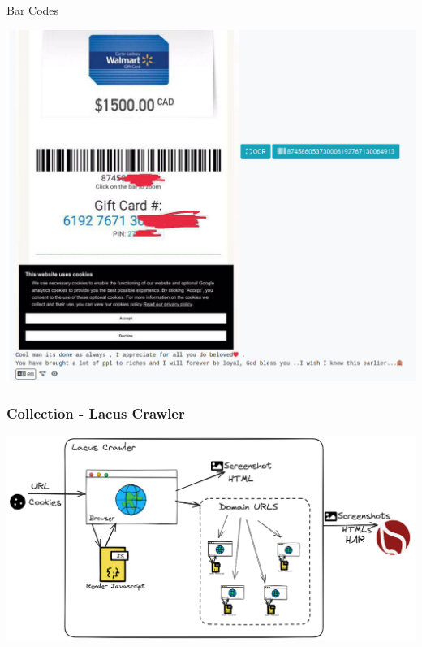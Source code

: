 \documentclass[10pt,aspectratio=169, colorlinks=true, linkcolor=circlBlue]{beamer}
\begin{document}
\begin{frame}[fragile]{Bar Codes}
    \begin{center}
        \includegraphics[scale=0.22]{screenshot/barcode.png}
    \end{center}
\end{frame}

\begin{frame}
    \frametitle{Collection - Lacus Crawler}
    \centerline{
        \includegraphics[scale=0.28]{images/ail-lacus.png}
    }
\end{frame}
\end{document}
